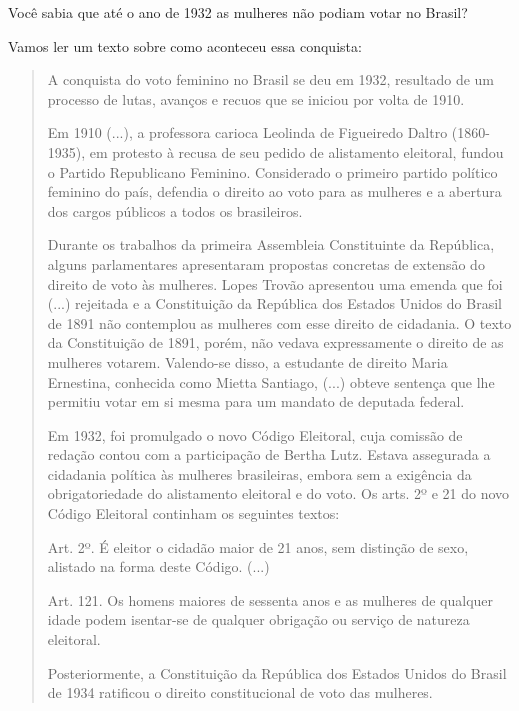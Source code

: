 


Você sabia que até o ano de 1932 as mulheres não podiam votar no Brasil?

Vamos ler um texto sobre como aconteceu essa conquista:

\begin{quote}
A conquista do voto feminino no Brasil se deu em 1932, resultado de um
processo de lutas, avanços e recuos que se iniciou por volta de 1910.

Em 1910 (...), a professora carioca Leolinda de Figueiredo Daltro
(1860-1935), em protesto à recusa de seu pedido de alistamento
eleitoral, fundou o Partido Republicano Feminino. Considerado o primeiro
partido político feminino do país, defendia o direito ao voto para as
mulheres e a abertura dos cargos públicos a todos os brasileiros.

Durante os trabalhos da primeira Assembleia Constituinte da República,
alguns parlamentares apresentaram propostas concretas de extensão do
direito de voto às mulheres. Lopes Trovão apresentou uma emenda que foi
(...) rejeitada e a Constituição da República dos Estados Unidos do
Brasil de 1891 não contemplou as mulheres com esse direito de cidadania.
O texto da Constituição de 1891, porém, não vedava expressamente o
direito de as mulheres votarem. Valendo-se disso, a estudante de direito
Maria Ernestina, conhecida como Mietta Santiago, (...) obteve sentença
que lhe permitiu votar em si mesma para um mandato de deputada federal.

Em 1932, foi promulgado o novo Código Eleitoral, cuja comissão de
redação contou com a participação de Bertha Lutz. Estava assegurada a
cidadania política às mulheres brasileiras, embora sem a exigência da
obrigatoriedade do alistamento eleitoral e do voto. Os arts. 2º e 21 do
novo Código Eleitoral continham os seguintes textos:

Art. 2º. É eleitor o cidadão maior de 21 anos, sem distinção de sexo,
alistado na forma deste Código. (...)

Art. 121. Os homens maiores de sessenta anos e as mulheres de qualquer
idade podem isentar-se de qualquer obrigação ou serviço de natureza
eleitoral.

Posteriormente, a Constituição da República dos Estados Unidos do Brasil
de 1934 ratificou o direito constitucional de voto das mulheres.

\end{quote}

